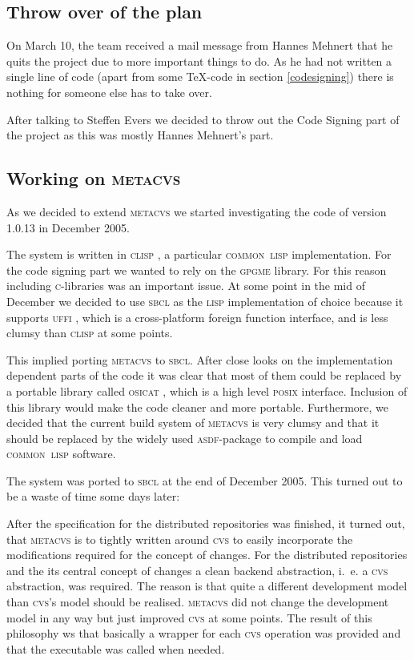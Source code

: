 \documentclass[fleqn, 10pt, a4paper]{report} \usepackage{amssymb}
\begin{document}
\subsection{Throw over of the plan}

On March 10, the team received a mail message from Hannes Mehnert that he
quits the project due to more important things to do. As he had not written
a single line of code (apart from some \TeX-code in section \ref{codesigning})
there is nothing for someone else has to take over.

After talking to Steffen Evers we decided to throw out the Code Signing
part of the project as this was mostly Hannes Mehnert's part.

\subsection{Working on \textsc{metacvs}}

As we decided to extend \textsc{metacvs} we started investigating the
code of version 1.0.13 in December 2005.

The system is written in \textsc{clisp} \cite{Clis06}, a particular
\textsc{common~lisp} implementation. For the code signing part we
wanted to rely on the \textsc{gpgme} \cite{Gnup06} library. For this reason
including \textsc{c}-libraries was an important issue. At some point
in the mid of December we decided to use \textsc{sbcl} \cite{Sbcl06} as the
\textsc{lisp} implementation of choice because it supports
\textsc{uffi} \cite{Uffi06},
which is a cross-platform foreign function interface,
and is less clumsy than \textsc{clisp} at some points.

This implied porting \textsc{metacvs} to \textsc{sbcl}. After close
looks on the implementation dependent parts of the code it was clear
that most of them could be replaced by a portable library called
\textsc{osicat} \cite{Osic06}, which is a high level \textsc{posix} interface.
Inclusion of this library would make the code cleaner and more
portable. Furthermore, we decided that the current build system of
\textsc{metacvs} is very clumsy and that it should be replaced by the
widely used \textsc{asdf}-package \cite{Asdf06} to compile and load
\textsc{common~lisp} software.

The system was ported to \textsc{sbcl} at the end of December 2005.
This turned out to be a waste of time some days later:

After the specification for the distributed repositories was finished,
it turned out, that \textsc{metacvs} is to tightly written around
\textsc{cvs} to easily incorporate the modifications required for the
concept of changes. For the distributed repositories and the its
central concept of changes a clean backend abstraction, i.~e. a
\textsc{cvs} abstraction, was required. The reason is that quite a
different development model than \textsc{cvs}'s model should be
realised. \textsc{metacvs} did not change the development model in any
way but just improved \textsc{cvs} at some points.  The result of this
philosophy ws that basically a wrapper for each \textsc{cvs} operation
was provided and that the executable was called when needed.
\end{document}
